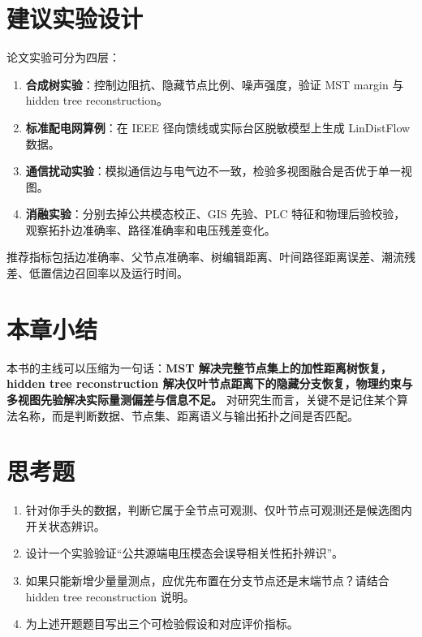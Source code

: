 \section{建议实验设计}

论文实验可分为四层：
\begin{enumerate}[label=(\arabic*)]
  \item \textbf{合成树实验}：控制边阻抗、隐藏节点比例、噪声强度，验证 MST margin 与 hidden tree reconstruction。
  \item \textbf{标准配电网算例}：在 IEEE 径向馈线或实际台区脱敏模型上生成 LinDistFlow 数据。
  \item \textbf{通信扰动实验}：模拟通信边与电气边不一致，检验多视图融合是否优于单一视图。
  \item \textbf{消融实验}：分别去掉公共模态校正、GIS 先验、PLC 特征和物理后验校验，观察拓扑边准确率、路径准确率和电压残差变化。
\end{enumerate}

推荐指标包括边准确率、父节点准确率、树编辑距离、叶间路径距离误差、潮流残差、低置信边召回率以及运行时间。

\section{本章小结}

本书的主线可以压缩为一句话：\textbf{MST 解决完整节点集上的加性距离树恢复，hidden tree reconstruction 解决仅叶节点距离下的隐藏分支恢复，物理约束与多视图先验解决实际量测偏差与信息不足。} 对研究生而言，关键不是记住某个算法名称，而是判断数据、节点集、距离语义与输出拓扑之间是否匹配。

\section*{思考题}
\begin{enumerate}
  \item 针对你手头的数据，判断它属于全节点可观测、仅叶节点可观测还是候选图内开关状态辨识。
  \item 设计一个实验验证“公共源端电压模态会误导相关性拓扑辨识”。
  \item 如果只能新增少量量测点，应优先布置在分支节点还是末端节点？请结合 hidden tree reconstruction 说明。
  \item 为上述开题题目写出三个可检验假设和对应评价指标。
\end{enumerate}
